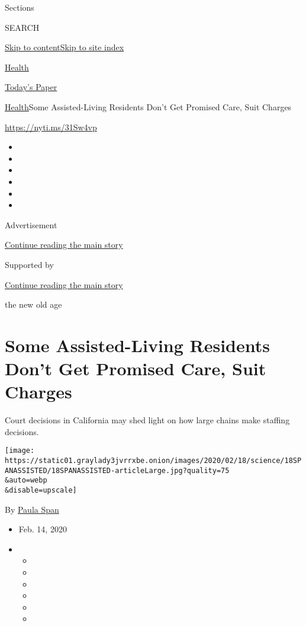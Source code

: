 Sections

SEARCH

\protect\hyperlink{site-content}{Skip to
content}\protect\hyperlink{site-index}{Skip to site index}

\href{https://www.nytimes3xbfgragh.onion/section/health}{Health}

\href{https://myaccount.nytimes3xbfgragh.onion/auth/login?response_type=cookie\&client_id=vi}{}

\href{https://www.nytimes3xbfgragh.onion/section/todayspaper}{Today's
Paper}

\href{/section/health}{Health}\textbar{}Some Assisted-Living Residents
Don't Get Promised Care, Suit Charges

\url{https://nyti.ms/31Sw4vp}

\begin{itemize}
\item
\item
\item
\item
\item
\item
\end{itemize}

Advertisement

\protect\hyperlink{after-top}{Continue reading the main story}

Supported by

\protect\hyperlink{after-sponsor}{Continue reading the main story}

the new old age

\hypertarget{some-assisted-living-residents-dont-get-promised-care-suit-charges}{%
\section{Some Assisted-Living Residents Don't Get Promised Care, Suit
Charges}\label{some-assisted-living-residents-dont-get-promised-care-suit-charges}}

Court decisions in California may shed light on how large chains make
staffing decisions.

\texttt{[image: https://static01.graylady3jvrrxbe.onion/images/2020/02/18/science/18SPANASSISTED/18SPANASSISTED-articleLarge.jpg?quality=75\\\&auto=webp\\\&disable=upscale]}

By \href{https://www.nytimes3xbfgragh.onion/by/paula-span}{Paula Span}

\begin{itemize}
\item
  Feb. 14, 2020
\item
  \begin{itemize}
  \item
  \item
  \item
  \item
  \item
  \item
  \end{itemize}
\end{itemize}

